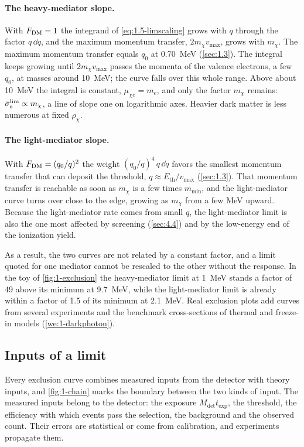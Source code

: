 \paragraph{The heavy-mediator slope.} With $F_{\mathrm{DM}} = 1$ the integrand of \cref{eq:1.5-limscaling} grows with $q$ through the factor $q\,\dd q$, and the maximum momentum transfer, $2m_\chi v_{\mathrm{max}}$, grows with $m_\chi$. The maximum momentum transfer equals $q_0$ at \SI{0.70}{MeV} (\cref{sec:1.3}). The integral keeps growing until $2m_\chi v_{\mathrm{max}}$ passes the momenta of the valence electrons, a few $q_0$, at masses around \SI{10}{MeV}; the curve falls over this whole range. Above about \SI{10}{MeV} the integral is constant, $\mu_{\chi e} = m_e$, and only the factor $m_\chi$ remains: $\bar{\sigma}_{e}^{\mathrm{lim}} \propto m_\chi$, a line of slope one on logarithmic axes. Heavier dark matter is less numerous at fixed $\rho_\chi$.

\paragraph{The light-mediator slope.} With $F_{\mathrm{DM}} = (q_0/q)^2$ the weight $(q_0/q)^4\,q\,\dd q$ favors the smallest momentum transfer that can deposit the threshold, $q \approx E_{\mathrm{th}}/v_{\mathrm{max}}$ (\cref{sec:1.3}). That momentum transfer is reachable as soon as $m_\chi$ is a few times $m_{\mathrm{min}}$, and the light-mediator curve turns over close to the edge, growing as $m_\chi$ from a few MeV upward. Because the light-mediator rate comes from small $q$, the light-mediator limit is also the one most affected by screening (\cref{sec:4.4}) and by the low-energy end of the ionization yield.

As a result, the two curves are not related by a constant factor, and a limit quoted for one mediator cannot be rescaled to the other without the response. In the toy of \cref{fig:1-exclusion} the heavy-mediator limit at \SI{1}{MeV} stands a factor of 49 above its minimum at \SI{9.7}{MeV}, while the light-mediator limit is already within a factor of 1.5 of its minimum at \SI{2.1}{MeV}. Real exclusion plots add curves from several experiments and the benchmark cross-sections of thermal and freeze-in models (\cref{we:1-darkphoton}).

\subsection{Inputs of a limit}\label{sec:1.5-inputs}

Every exclusion curve combines measured inputs from the detector with theory inputs, and \cref{fig:1-chain} marks the boundary between the two kinds of input. The measured inputs belong to the detector: the exposure $M_{\mathrm{det}}t_{\mathrm{exp}}$, the threshold, the efficiency with which events pass the selection, the background and the observed count. Their errors are statistical or come from calibration, and experiments propagate them.

